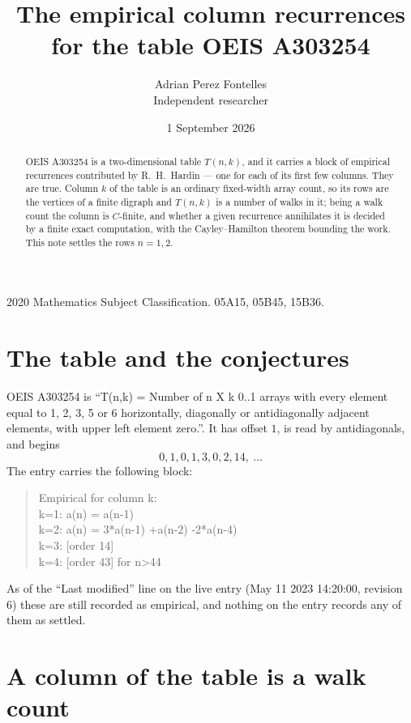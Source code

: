\documentclass[11pt,a4paper]{article}
\title{The empirical column recurrences for the table OEIS A303254}
\author{Adrian Perez Fontelles\\ \small Independent researcher}
\date{1 September 2026}
\theoremstyle{plain}
\theoremstyle{definition}
\begin{document}
\maketitle

\begin{abstract}
OEIS A303254 is a two-dimensional table $T(n,k)$, and it carries a block of empirical
recurrences contributed by R.~H.~Hardin --- one for each of its first few columns. They are
true. Column $k$ of the table is an ordinary fixed-width array count, so its rows are the
vertices of a finite digraph and $T(n,k)$ is a number of walks in it; being a walk count the
column is $C$-finite, and whether a given recurrence annihilates it is decided by a finite
exact computation, with the Cayley--Hamilton theorem bounding the work. This note settles the rows $n=1, 2$.
\end{abstract}

\noindent\small 2020 Mathematics Subject Classification. 05A15, 05B45, 15B36.\normalsize

\section{The table and the conjectures}

OEIS A303254 is ``T(n,k) = Number of n X k 0..1 arrays with every element equal to 1, 2, 3, 5 or 6 horizontally, diagonally or antidiagonally adjacent elements, with upper left element zero.''. It has offset $1$, is
read by antidiagonals, and begins
\[
0, 1, 0, 1, 3, 0, 2, 14,\ \dots
\]
The entry carries the following block:
\begin{quote}\small
Empirical for column k:\\
k=1: a(n) = a(n-1)\\
k=2: a(n) = 3*a(n-1) +a(n-2) -2*a(n-4)\\
k=3: [order 14]\\
k=4: [order 43] for n>44\\
\end{quote}
As of the ``Last modified'' line on the live entry (May 11 2023 14:20:00, revision 6) these are still
recorded as empirical, and nothing on the entry records any of them as settled.

\section{A column of the table is a walk count}
\end{document}
